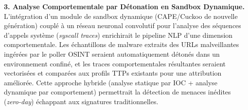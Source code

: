 \textbf{3. Analyse Comportementale par Détonation en Sandbox Dynamique.} L'intégration d'un module de sandbox dynamique (CAPE/Cuckoo de nouvelle génération) couplé à un réseau neuronal convolutif pour l'analyse des séquences d'appels système (\textit{syscall traces}) enrichirait le pipeline NLP d'une dimension comportementale. Les échantillons de malware extraits des URLs malveillantes ingérées par le poller OSINT seraient automatiquement détonés dans un environnement confiné, et les traces comportementales résultantes seraient vectorisées et comparées aux profils TTPs existants pour une attribution améliorée. Cette approche hybride (analyse statique par IOC + analyse dynamique par comportement) permettrait la détection de menaces inédites (\textit{zero-day}) échappant aux signatures traditionnelles.
